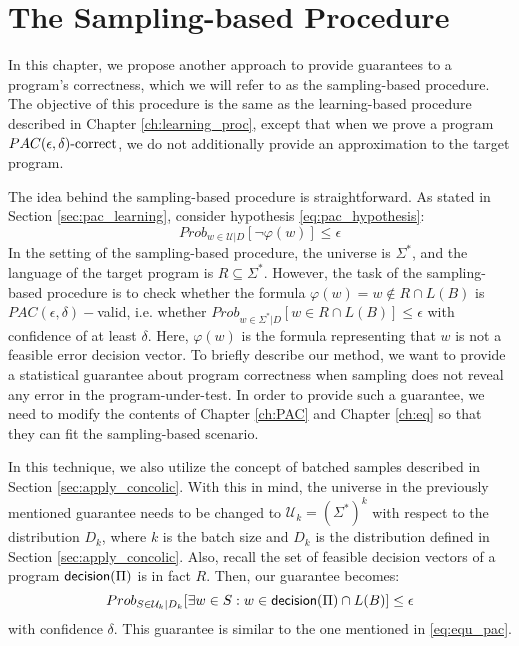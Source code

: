\chapter{The Sampling-based Procedure}\label{ch:sampling_proc}

In this chapter, we propose another approach to provide guarantees to a program's correctness, which we will refer to as the sampling-based procedure. The objective of this procedure is the same as the learning-based procedure described in Chapter \ref{ch:learning_proc}, except that when we prove a program $PAC(\epsilon, \delta)\text{-correct}$, we do not additionally provide an approximation to the target program. 

The idea behind the sampling-based procedure is straightforward. As stated in Section \ref{sec:pac_learning}, consider hypothesis \ref{eq:pac_hypothesis}:
\begin{equation*}
Prob_{w \in \mathcal{U}|D} [\neg \varphi (w)] \leq \epsilon
\end{equation*}
In the setting of the sampling-based procedure, the universe is $\Sigma^\ast$, and the language of the target program is $R \subseteq \Sigma^\ast$. However, the task of the sampling-based procedure is to check whether the formula $\varphi(w) = w \notin R \cap L(B)$ is $PAC(\epsilon, \delta)-$valid, i.e. whether $Prob_{w \in \Sigma^\ast | D } [w \in R \cap L(B)] \leq \epsilon$ with confidence of at least $\delta$. Here, $\varphi(w)$ is the formula representing that $w$ is not a feasible error decision vector. To briefly describe our method, we want to provide a statistical guarantee about program correctness when sampling does not reveal any error in the program-under-test. In order to provide such a guarantee, we need to modify the contents of Chapter \ref{ch:PAC} and Chapter \ref{ch:eq} so that they can fit the sampling-based scenario.

In this technique, we also utilize the concept of batched samples described in Section \ref{sec:apply_concolic}. With this in mind, the universe in the previously mentioned guarantee needs to be changed to $\mathcal{U}_k = (\Sigma^\ast)^k$ with respect to the distribution $D_k$, where $k$ is the batch size and $D_k$ is the distribution defined in Section \ref{sec:apply_concolic}. Also, recall the set of feasible decision vectors of a program $\mathsf{decision}(\Pi)$ is in fact $R$. Then, our guarantee becomes:
\begin{equation}\label{eq:sampling_guarantee}
Prob_{S \in \mathcal{U}_k | D_k} [\exists w \in S : w \in \mathsf{decision}(\Pi) \cap L(B)] \leq \epsilon
\end{equation} 
with confidence $\delta$. This guarantee is similar to the one mentioned in \ref{eq:equ_pac}. 

